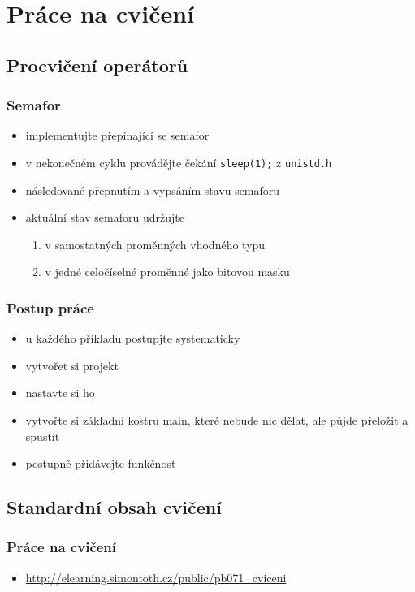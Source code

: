 \section{Práce na cvičení}
\subsection{Procvičení operátorů}

\begin{frame}
	\frametitle{Semafor}
	\begin{itemize}
		\item{implementujte přepínající se semafor}
		\item{v nekonečném cyklu provádějte čekání \texttt{sleep(1);} z \texttt{unistd.h}}
		\item{následované přepnutím a vypsáním stavu semaforu}
		\item{aktuální stav semaforu udržujte}
		\begin{enumerate}
			\item{v samostatných proměnných vhodného typu}
			\item{v jedné celočíselné proměnné jako bitovou masku}
		\end{enumerate}
	\end{itemize}
\end{frame}

\begin{frame}
	\frametitle{Postup práce}
	\begin{itemize}
		\item{u každého příkladu postupjte systematicky}
		\item{vytvořet si projekt}
		\item{nastavte si ho}
		\item{vytvořte si základní kostru main, které nebude nic dělat, ale půjde přeložit a spustit}
		\item{postupně přidávejte funkčnost}
	\end{itemize}
\end{frame}

\subsection{Standardní obsah cvičení}

\begin{frame}
	\frametitle{Práce na cvičení}
	\begin{itemize}
		\item{\href{http://elearning.simontoth.cz/public/pb071\_cviceni}{http://elearning.simontoth.cz/public/pb071\_cviceni}}
	\end{itemize}
\end{frame}




